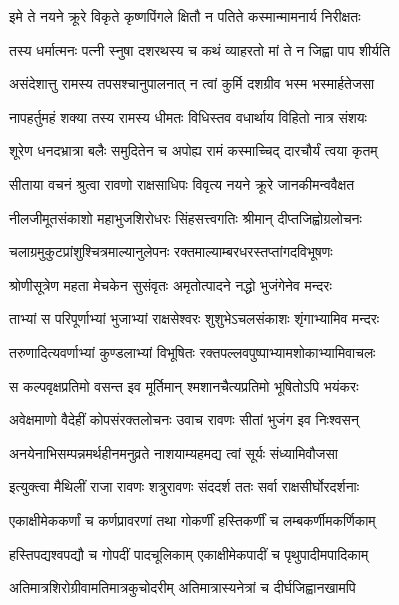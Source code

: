 \twolineshloka
{इमे ते नयने क्रूरे विकृते कृष्णपिंगले}
{क्षितौ न पतिते कस्मान्मामनार्य निरीक्षतः} %

\twolineshloka
{तस्य धर्मात्मनः पत्नी स्नुषा दशरथस्य च}
{कथं व्याहरतो मां ते न जिह्वा पाप शीर्यति} %

\twolineshloka
{असंदेशात्तु रामस्य तपसश्चानुपालनात्}
{न त्वां कुर्मि दशग्रीव भस्म भस्मार्हतेजसा} %

\twolineshloka
{नापहर्तुमहं शक्या तस्य रामस्य धीमतः}
{विधिस्तव वधार्थाय विहितो नात्र संशयः} %

\twolineshloka
{शूरेण धनदभ्रात्रा बलैः समुदितेन च}
{अपोह्य रामं कस्माच्चिद् दारचौर्यं त्वया कृतम्} %

\twolineshloka
{सीताया वचनं श्रुत्वा रावणो राक्षसाधिपः}
{विवृत्य नयने क्रूरे जानकीमन्ववैक्षत} %

\twolineshloka
{नीलजीमूतसंकाशो महाभुजशिरोधरः}
{सिंहसत्त्वगतिः श्रीमान् दीप्तजिह्वोग्रलोचनः} %

\twolineshloka
{चलाग्रमुकुटप्रांशुश्चित्रमाल्यानुलेपनः}
{रक्तमाल्याम्बरधरस्तप्तांगदविभूषणः} %

\twolineshloka
{श्रोणीसूत्रेण महता मेचकेन सुसंवृतः}
{अमृतोत्पादने नद्धो भुजंगेनेव मन्दरः} %

\twolineshloka
{ताभ्यां स परिपूर्णाभ्यां भुजाभ्यां राक्षसेश्वरः}
{शुशुभेऽचलसंकाशः शृंगाभ्यामिव मन्दरः} %

\twolineshloka
{तरुणादित्यवर्णाभ्यां कुण्डलाभ्यां विभूषितः}
{रक्तपल्लवपुष्पाभ्यामशोकाभ्यामिवाचलः} %

\twolineshloka
{स कल्पवृक्षप्रतिमो वसन्त इव मूर्तिमान्}
{श्मशानचैत्यप्रतिमो भूषितोऽपि भयंकरः} %

\twolineshloka
{अवेक्षमाणो वैदेहीं कोपसंरक्तलोचनः}
{उवाच रावणः सीतां भुजंग इव निःश्वसन्} %

\twolineshloka
{अनयेनाभिसम्पन्नमर्थहीनमनुव्रते}
{नाशयाम्यहमद्य त्वां सूर्यः संध्यामिवौजसा} %

\twolineshloka
{इत्युक्त्वा मैथिलीं राजा रावणः शत्रुरावणः}
{संददर्श ततः सर्वा राक्षसीर्घोरदर्शनाः} %

\twolineshloka
{एकाक्षीमेककर्णां च कर्णप्रावरणां तथा}
{गोकर्णीं हस्तिकर्णीं च लम्बकर्णीमकर्णिकाम्} %

\twolineshloka
{हस्तिपद्यश्वपद्यौ च गोपदीं पादचूलिकाम्}
{एकाक्षीमेकपादीं च पृथुपादीमपादिकाम्} %

\twolineshloka
{अतिमात्रशिरोग्रीवामतिमात्रकुचोदरीम्}
{अतिमात्रास्यनेत्रां च दीर्घजिह्वानखामपि} %

